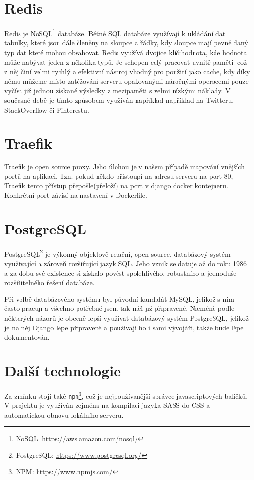 \section{Redis}
Redis je NoSQL\footnote{NoSQL: \url{https://aws.amazon.com/nosql/}} databáze. Běžné SQL databáze využívají k ukládání dat tabulky, které jsou dále členěny na sloupce a řádky, kdy sloupce mají pevně daný typ dat které mohou obsahovat. Redis využívá dvojice klíč:hodnota, kde hodnota může nabývat jeden z několika typů. Je schopen celý pracovat uvnitř paměti, což z něj činí velmi rychlý a efektivní nástroj vhodný pro použití jako cache, kdy díky němu můžeme místo zatěžování serveru opakovanými náročnými operacemi pouze vyčíst již jednou získané výsledky z mezipaměti s velmi nízkými náklady. V současné době je tímto způsobem využíván například například na Twitteru, StackOverflow či Pinterestu.

\section{Traefik}
Traefik je open source proxy. Jeho úlohou je v našem případě mapování vnějších portů na aplikaci. Tzn. pokud někdo přistoupí na adresu serveru na port 80, Traefik tento přístup přepošle(přeloží) na port v django docker kontejneru. Konkrétní port závisí na nastavení v Dockerfile.


\section{PostgreSQL}
PostgreSQL\footnote{PostgreSQL: \url{https://www.postgresql.org/}} je výkonný objektově-relační, open-source, databázový systém využívající a zároveň rozšiřující jazyk SQL. Jeho vznik se datuje až do roku 1986 a za dobu své existence si získalo pověst spolehlivého, robustního a jednoduše rozšiřitelného řešení databáze. \cite{PostgreSQL}
\par Při volbě databázového systému byl původní kandidát MySQL, jelikož s ním často pracuji a všechno potřebné jsem tak měl již připravené. Nicméně podle některých názorů \cite{WHY-POSTGRES1}\cite{WHY-POSTGRES2} je obecně lepší využívat databázový systém PostgreSQL, jelikož je na něj Django lépe připravené a používají ho i sami vývojáři, takže bude lépe dokumentován.

\section{Další technologie}
Za zmínku stojí také \texttt{npm}\footnote{NPM: \url{https://www.npmjs.com/}}, což je nejpoužívanější správce javascriptových balíčků. V projektu je využíván zejména na kompilaci jazyka SASS do CSS a automatickou obnovu lokálního serveru.



